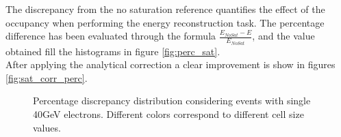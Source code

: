 The discrepancy from the no saturation reference quantifies the effect of the occupancy when performing the energy reconstruction task. The percentage difference has been evaluated through the formula $\frac{E_{NoSat}-E}{E_{NoSat}}$, and the value obtained fill the histograms in figure \ref{fig:perc_sat}.\\
After applying the analytical correction a clear improvement is show in figures \ref{fig:sat_corr_perc}.\\

\begin{figure}
	\centering
	 \quad
	\caption{Percentage discrepancy distribution considering events with single 40GeV electrons. Different colors correspond to different cell size values.}
	\label{fig:sat_events}
\end{figure}

